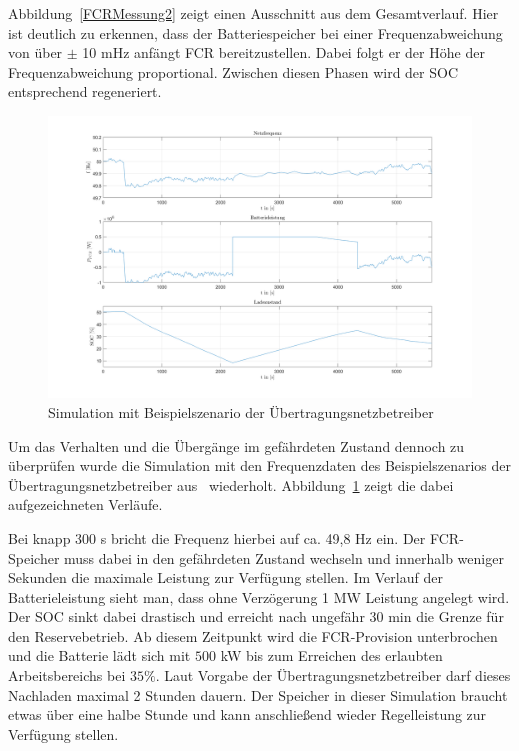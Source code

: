 Abbildung~\ref{FCRMessung2} zeigt einen Ausschnitt aus dem Gesamtverlauf.
Hier ist deutlich zu erkennen, dass der Batteriespeicher bei einer Frequenzabweichung von über $\pm$ 10 mHz
anfängt FCR bereitzustellen.
Dabei folgt er der Höhe der Frequenzabweichung proportional. 
Zwischen diesen Phasen wird der SOC entsprechend regeneriert.

\begin{figure}[h!]
	\centering
	\includegraphics[width=14cm]{Abbildungen/SteuerungFCR3.png}
	\caption{Simulation mit Beispielszenario der Übertragungsnetzbetreiber}\label{FCRMessung3}
\end{figure}

Um das Verhalten und die Übergänge im gefährdeten Zustand dennoch zu überprüfen wurde die Simulation mit den Frequenzdaten
des Beispielszenarios der Übertragungsnetzbetreiber aus~\parencite[]{Reservebetrieb} wiederholt.
Abbildung~\ref{FCRMessung3} zeigt die dabei aufgezeichneten Verläufe.

Bei knapp 300 s bricht die Frequenz hierbei auf ca. 49,8 Hz ein.
Der FCR-Speicher muss dabei in den gefährdeten Zustand wechseln und innerhalb weniger Sekunden
die maximale Leistung zur Verfügung stellen.
Im Verlauf der Batterieleistung sieht man, dass ohne Verzögerung 1 MW Leistung angelegt wird.
Der SOC sinkt dabei drastisch und erreicht nach ungefähr 30 min die Grenze für den Reservebetrieb.
Ab diesem Zeitpunkt wird die FCR-Provision unterbrochen und die Batterie lädt sich mit $500$ kW 
bis zum Erreichen des erlaubten Arbeitsbereichs bei $35 \%$.
Laut Vorgabe der Übertragungsnetzbetreiber darf dieses Nachladen maximal 2 Stunden dauern.
Der Speicher in dieser Simulation braucht etwas über eine halbe Stunde und kann anschließend wieder
Regelleistung zur Verfügung stellen.




